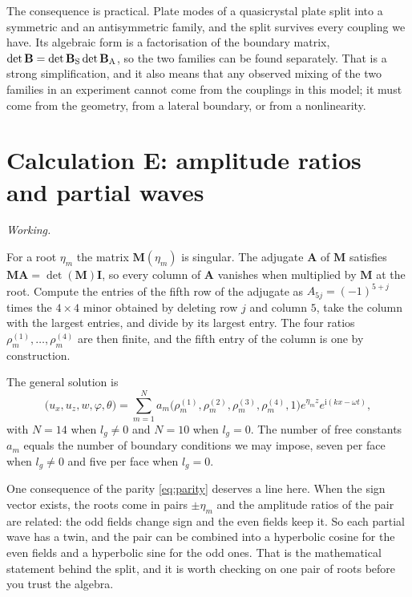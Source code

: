 \documentclass[11pt,a4paper]{article}
\newif\ifshowworked \showworkedtrue
\newenvironment{worked}{\ifshowworked\par\smallskip\noindent\textit{Working.}\par\else\setbox0\vbox\bgroup\fi}{\ifshowworked\par\smallskip\else\egroup\fi}
\newcommand{\ii}{\mathrm{i}}
\begin{document}
The consequence is practical. Plate modes of a quasicrystal plate split into a symmetric and an
antisymmetric family, and the split survives every coupling we have. Its algebraic form is a factorisation
of the boundary matrix, $\det\mathbf B=\det\mathbf B_{\rm S}\det\mathbf B_{\rm A}$, so the two families
can be found separately. That is a strong simplification, and it also means that any observed mixing of the two families
in an experiment cannot come from the couplings in this model; it must come from the geometry, from a
lateral boundary, or from a nonlinearity.

\section{Calculation E: amplitude ratios and partial waves}\label{sec:E}

\begin{worked}
For a root $\eta_m$ the matrix $\mathbf M(\eta_m)$ is singular. The adjugate $\mathbf A$ of
$\mathbf M$ satisfies $\mathbf M\mathbf A=\det(\mathbf M)\mathbf I$, so every column of $\mathbf A$ vanishes
when multiplied by $\mathbf M$ at the root. Compute the entries of the fifth row of the adjugate as
$A_{5j}=(-1)^{5+j}$ times the $4\times4$ minor obtained by deleting row $j$ and column $5$, take the column
with the largest entries, and divide by its largest entry. The four ratios $\rho^{(1)}_m,\dots,\rho^{(4)}_m$
are then finite, and the fifth entry of the column is one by construction.
\end{worked}

\noindent The general solution is
\begin{equation}\label{eq:general}
\bigl(u_x,u_z,w,\varphi,\theta\bigr)=\sum_{m=1}^{N}a_m
\bigl(\rho^{(1)}_m,\rho^{(2)}_m,\rho^{(3)}_m,\rho^{(4)}_m,1\bigr)e^{\eta_mz}e^{\ii(kx-\omega t)},
\end{equation}
with $N=14$ when $l_g\ne0$ and $N=10$ when $l_g=0$. The number of free constants $a_m$ equals the number of
boundary conditions we may impose, seven per face when $l_g\ne0$ and five per face when $l_g=0$.

One consequence of the parity \eqref{eq:parity} deserves a line here. When the sign vector exists, the
roots come in pairs $\pm\eta_m$ and the amplitude ratios of the pair are related: the odd fields change sign
and the even fields keep it. So each partial wave has a twin, and the pair can be combined into a
hyperbolic cosine for the even fields and a hyperbolic sine for the odd ones. That is the mathematical
statement behind the split, and it is worth checking on one pair of roots before you trust the algebra.
\end{document}
